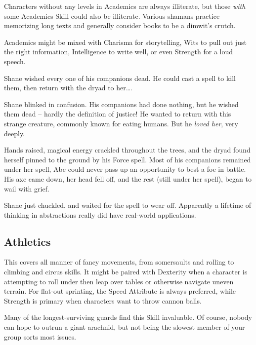 \begin{multicols}{2}
{\begin{tabularx}{\linewidth}{Yc}
  \end{tabularx}

}

Characters without any levels in Academics are always illiterate, but those \emph{with} some Academics Skill could also be illiterate.
Various shamans practice memorizing long texts and generally consider books to be a dimwit's crutch.

Academics might be mixed with Charisma for storytelling, Wits to pull out just the right information, Intelligence to write well, or even Strength for a loud speech.

\begin{exampletext}

  Shane wished every one of his companions dead.
  He could cast a spell to kill them, then return with the dryad to her\ldots.

  Shane blinked in confusion. 
  His companions had done nothing, but he wished them dead -- hardly the definition of justice!
  He wanted to return with this strange creature, commonly known for eating humans.
  But he \emph{loved her}, very deeply.

  Hands raised, magical energy crackled throughout the trees, and the dryad found herself pinned to the ground by his Force spell.
  Most of his companions remained under her spell, Abe could never pass up an opportunity to best a foe in battle.
  His axe came down, her head fell off, and the rest (still under her spell), began to wail with grief.

  Shane just chuckled, and waited for the spell to wear off.
  Apparently a lifetime of thinking in abstractions really did have real-world applications.

\end{exampletext}

\subsection{Athletics}

This covers all manner of fancy movements, from somersaults and rolling to climbing and circus skills.
It might be paired with Dexterity when a character is attempting to roll under then leap over tables or otherwise navigate uneven terrain.
For flat-out sprinting, the Speed Attribute is always preferred, while Strength is primary when characters want to throw cannon balls.

Many of the longest-surviving \glspl{guard} find this Skill invaluable.
Of course, nobody can hope to outrun a giant arachnid, but not being the slowest member of your group sorts most issues.


\end{multicols}
